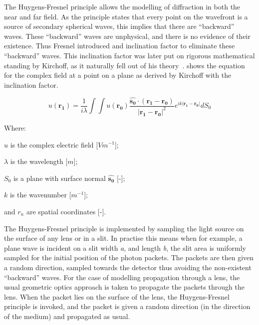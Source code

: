 The Huygens-Fresnel principle allows the modelling of diffraction in both the near and far field.
As the principle states that every point on the wavefront is a source of secondary spherical waves, this implies that there are ``backward'' waves.
These ``backward'' waves are unphysical, and there is no evidence of their existence.
Thus Fresnel introduced and inclination factor to eliminate these ``backward'' waves.
This inclination factor was later put on rigorous mathematical standing by Kirchoff, as it naturally fell out of his theory~\cite{kirchhoff1883ann,born2000principles}.
 shows the equation for the complex field at a point on a plane as derived by Kirchoff with the inclination factor.

\begin{equation}
u(\mathbf{r_1})=\frac{1}{i\lambda}\int\int u(\mathbf{r_0})\frac{\mathbf{\hat{s_0}} \cdot (\mathbf{r_1} - \mathbf{r_0})}{\left|\mathbf{r_1} - \mathbf{r_0}\right|^2}e^{ik\left|\mathbf{r_1} - \mathbf{r_0}\right|}dS_0
\label{eqn:kirchhoffeqn}
\end{equation}

\noindent Where:

    \indent $u$ is the complex electric field [$Vm^{-1}$];

    \indent $\lambda$ is the wavelength [$m$];

    \indent $S_0$ is a plane with surface normal $\mathbf{\hat{s_0}}$ [-];

    \indent $k$ is the wavenumber [$m^{-1}$];

    \indent and $r_n$ are spatial coordinates [-]. 

\medskip

The Huygens-Fresnel principle is implemented by sampling the light source on the surface of any lens or in a slit.
In practise this means when for example, a plane wave is incident on a slit width \textit{a}, and length \textit{b}, the slit area is uniformly sampled for the initial position of the photon packets.
The packets are then given a random direction, sampled towards the detector thus avoiding the non-existent ``backward'' waves.
For the case of modelling propagation through a lens, the usual geometric optics approach is taken to propagate the packets through the lens.
When the packet lies on the surface of the lens, the Huygens-Fresnel principle is invoked, and the packet is given a random direction (in the direction of the medium) and propagated as usual.

\medskip

